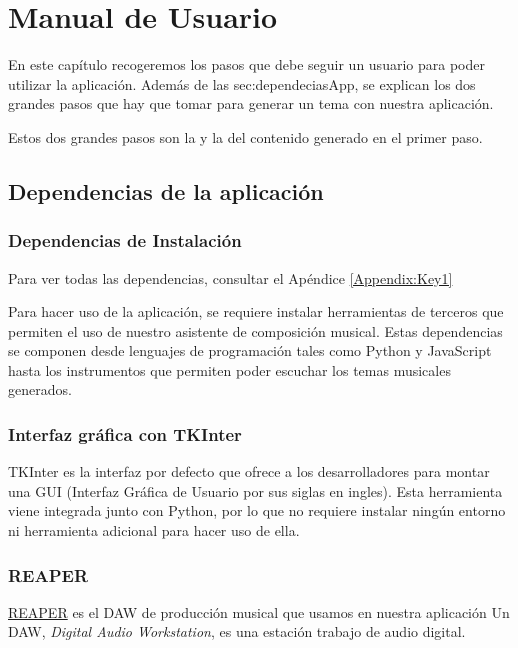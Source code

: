 \chapter{Manual de Usuario}
\label{cap:descripcionTrabajo}

En este capítulo recogeremos los pasos que debe seguir un usuario para poder utilizar la aplicación. Además de las \refname{sec:dependeciasApp}, se explican los dos grandes pasos que hay que tomar para generar un tema con nuestra aplicación. 

Estos dos grandes pasos son la  y la  del contenido generado en el primer paso. 

\section{Dependencias de la aplicación}
\label{sec:dependeciasApp}
\subsection{Dependencias de Instalación}
	Para ver todas las dependencias, consultar el Apéndice \ref{Appendix:Key1}

	Para hacer uso de la aplicación, se requiere instalar herramientas de terceros que permiten el uso de nuestro asistente de composición musical.
	Estas dependencias se componen desde lenguajes de programación tales como Python y JavaScript hasta los instrumentos que permiten poder escuchar los temas musicales generados.

\subsection{Interfaz gráfica con TKInter}
	TKInter es la interfaz por defecto que \PythonLink{} ofrece a los desarrolladores para montar una GUI (Interfaz Gráfica de Usuario por sus siglas en ingles).
	Esta herramienta viene integrada junto con Python, por lo que no requiere instalar ningún entorno ni herramienta adicional para hacer uso de ella.



\subsection{REAPER}
\label{subsec:reaper}
	\href{https://www.reaper.fm/}{REAPER} es el DAW de producción musical que usamos en nuestra aplicación
	Un DAW, \textit{Digital Audio Workstation}, es una estación trabajo de audio digital.

